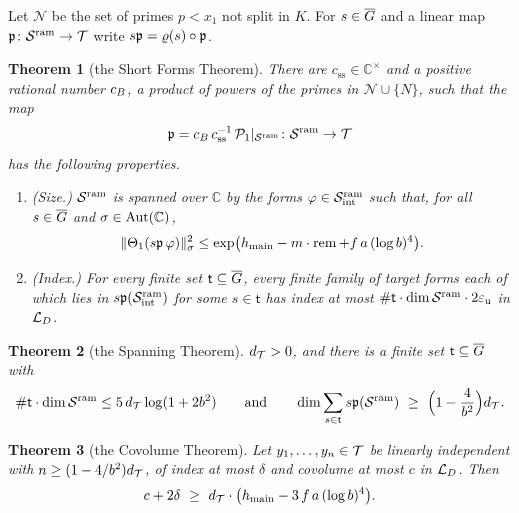 \documentclass[10pt]{amsart}
\newtheorem{theorem}{Theorem}[section]
\theoremstyle{definition}
\theoremstyle{remark}
\newcommand{\C}{\mathbb C}
\begin{document}
Let $\mathcal N$ be the set of primes $p<x_1$ not split in $K$. For $s\in\overline G$ and a linear map
$\mathfrak p\colon\mathcal S^{\mathrm{ram}}\to\mathcal T$ write $s\mathfrak p=\varrho(s)\circ\mathfrak p$.

\begin{theorem}[the Short Forms Theorem]\label{thm:srcA}
There are $c_{\mathrm{ss}}\in\C^\times$ and a positive rational number $c_B$, a product of
powers of the primes in $\mathcal N\cup\{N\}$, such that the map
\[
\mathfrak p=c_B\,c_{\mathrm{ss}}^{-1}\,\mathcal P_1|_{\mathcal S^{\mathrm{ram}}}\colon\mathcal S^{\mathrm{ram}}\to\mathcal T
\]
has the following properties.
\begin{enumerate}
\item[(a)] \emph{(Size.)} $\mathcal S^{\mathrm{ram}}$ is spanned over $\C$ by the forms
$\varphi\in\mathcal S^{\mathrm{ram}}_{\mathrm{int}}$ such that, for all $s\in\overline G$ and $\sigma\in\auAut(\C)$,
\[
\|\Theta_1(s\mathfrak p\,\varphi)\|_\sigma^2\le\exp\bigl(h_{\mathrm{main}}-m\cdot\operatorname{rem}+f\,a\,(\log b)^4\bigr).
\]
\item[(b)] \emph{(Index.)} For every finite set $\mathsf t\subseteq\overline G$, every finite family of
target forms each of which lies in $s\mathfrak p(\mathcal S^{\mathrm{ram}}_{\mathrm{int}})$ for some $s\in\mathsf t$ has
index at most $\#\mathsf t\cdot\dim\mathcal S^{\mathrm{ram}}\cdot2\varepsilon_{\mathrm u}$ in $\mathcal L_D$.
\end{enumerate}
\end{theorem}

\begin{theorem}[the Spanning Theorem]\label{thm:srcB}
$d_{\mathcal T}>0$, and there is a finite set $\mathsf t\subseteq\overline G$ with
\[
\#\mathsf t\cdot\dim\auSram\le5\,\audT\log(1+2b^2)\qquad\text{and}\qquad
\dim\sum_{s\in\mathsf t}s\aupp(\auSram)\ \ge\ \Bigl(1-\frac4{b^2}\Bigr)\audT .
\]
\end{theorem}

\begin{theorem}[the Covolume Theorem]\label{thm:srcC}
Let $y_1,\dots,y_n\in\mathcal T$ be linearly independent with $n\ge(1-4/b^2)d_{\mathcal T}$, of index at most
$\delta$ and covolume at most $c$ in $\mathcal L_D$. Then
\[
c+2\delta\ \ge\ \audT\cdot\bigl(\auhmain-3\,f\,a\,(\log b)^4\bigr).
\]
\end{theorem}
\end{document}
